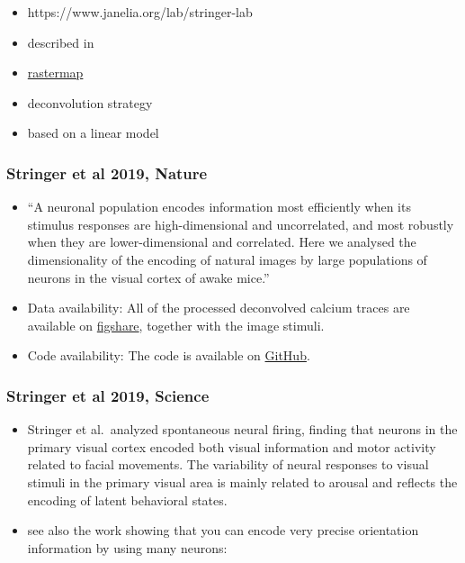 \documentclass[brainsci, %
               review,submit,pdftex,moreauthors%
               ]{Definitions/mdpi}
\begin{document}
\begin{itemize}
 \item
  https://www.janelia.org/lab/stringer-lab
\item
  described in~\citep{pachitariu_robustness_2018}
\item
  \href{https://github.com/MouseLand/rastermap}{rastermap}
\item
  deconvolution strategy
\item
  based on a linear model
\end{itemize}

\subsubsection{Stringer et al 2019, Nature~\citep{stringer_high-dimensional_2019}}\label{stringer-et-al-2019-nature-stringer2019nature}
\begin{itemize}
 \item
  ``A neuronal population encodes information most efficiently when its stimulus responses are high-dimensional and uncorrelated, and most robustly when they are lower-dimensional and correlated. Here we analysed the dimensionality of the encoding of natural images by large populations of neurons in the visual cortex of awake mice.''
\item
  Data availability: All of the processed deconvolved calcium traces are available on \href{https://figshare.com/articles/Recordings_of_ten_thousand_neurons_in_visual_cortex_in_response_to_2_800_natural_images/6845348}{figshare}, together with the image stimuli.
\item
  Code availability: The code is available on \href{https://github.com/MouseLand/stringer-pachitariu-et-al-2018b}{GitHub}.
\end{itemize}

\subsubsection{Stringer et al 2019, Science~\citep{stringer_spontaneous_2019}}\label{stringer-et-al-2019-science-stringer2019science}
\begin{itemize}
\item
  Stringer et al.~analyzed spontaneous neural firing, finding that neurons in the primary visual cortex encoded both visual information and motor activity related to facial movements. The variability of neural responses to visual stimuli in the primary visual area is mainly related to arousal and reflects the encoding of latent behavioral states.
\item
  see also the work showing that you can encode very precise orientation information by using many neurons:~\citep{stringer_high-precision_2021}
\end{itemize}
\end{document}
